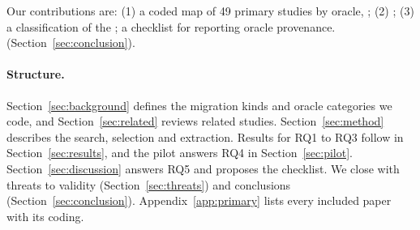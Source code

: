 Our contributions are: (1) a coded map of 49 primary studies by oracle, ; (2) ; (3) a classification of the ;  a checklist for reporting oracle provenance.  (Section~\ref{sec:conclusion}).

\begin{added}
\paragraph{Structure.} Section~\ref{sec:background} defines the migration kinds and oracle categories we code, and Section~\ref{sec:related} reviews related studies. Section~\ref{sec:method} describes the search, selection and extraction. Results for RQ1 to RQ3 follow in Section~\ref{sec:results}, and the pilot answers RQ4 in Section~\ref{sec:pilot}. Section~\ref{sec:discussion} answers RQ5 and proposes the checklist. We close with threats to validity (Section~\ref{sec:threats}) and conclusions (Section~\ref{sec:conclusion}). Appendix~\ref{app:primary} lists every included paper with its coding.
\end{added}